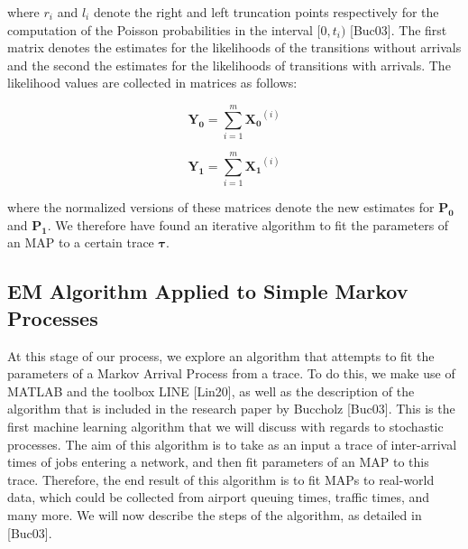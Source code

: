 \documentclass[a4paper,11pt,titlepage]{article}
\begin{document}
where $r_i$ and $l_i$ denote the right and left truncation points respectively for the computation of the Poisson probabilities in the interval $[0,t_i)$ [Buc03]. The first matrix denotes the estimates for the likelihoods of the transitions without arrivals and the second the estimates for the likelihoods of transitions with arrivals. The likelihood values are collected in matrices as follows: 

\begin{equation}
    \mathbf{Y_0} = \sum_{i=1}^{m} \mathbf{X_0}^{(i)} 
\end{equation}

\begin{equation}
    \mathbf{Y_1} = \sum_{i=1}^{m} \mathbf{X_1}^{(i)} 
\end{equation}

where the normalized versions of these matrices denote the new estimates for $\mathbf{P_0}$ and $\mathbf{P_1}$. We therefore have found an iterative algorithm to fit the parameters of an MAP to a certain trace $\bm{\tau}$. 

\subsection{EM Algorithm Applied to Simple Markov Processes}

At this stage of our process, we explore an algorithm that attempts to fit the parameters of a Markov Arrival Process from a trace. To do this, we make use of MATLAB and the toolbox LINE [Lin20], as well as the description of the algorithm that is included in the research paper by Buccholz [Buc03]. This is the first machine learning algorithm that we will discuss with regards to stochastic processes. The aim of this algorithm is to take as an input a trace of inter-arrival times of jobs entering a network, and then fit parameters of an MAP to this trace. Therefore, the end result of this algorithm is to fit MAPs to real-world data, which could be collected from airport queuing times, traffic times, and many more. We will now describe the steps of the algorithm, as detailed in [Buc03].
\end{document}

